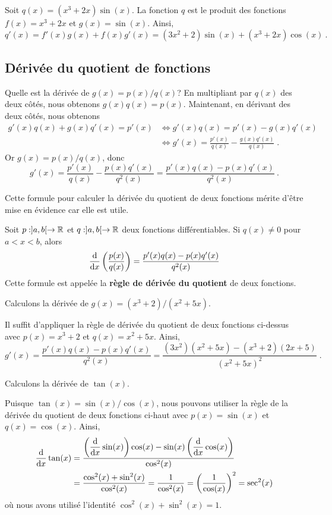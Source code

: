 {\begin{egg}
Soit $q(x) = (x^3+2x)\sin(x)$.  La fonction $q$ est le produit des
fonctions $f(x) = x^3+2x$ et $g(x) = \sin(x)$.  Ainsi,
\[
q'(x) = f'(x) g(x) + f(x) g'(x) = (3x^2 +2)\sin(x) + (x^3+2x)\cos(x) \ .
\]
\end{egg}

\subsection{Dérivée du quotient de fonctions}

Quelle est la dérivée de $g(x) = p(x) / q(x)$?  En multipliant par
$q(x)$ des deux côtés, nous obtenons $g(x) q(x) = p(x)$.  Maintenant, en
dérivant des deux côtés, nous obtenons
\begin{align*}
g'(x) q(x) + g(x) q'(x) = p'(x)
&\Leftrightarrow g'(x) q(x) = p'(x) - g(x) q'(x) \\
&\Leftrightarrow g'(x) = \frac{p'(x)}{q(x)} - \frac{g(x) q'(x)}{q(x)} \; .
\end{align*}
Or $g(x) = p(x) / q(x)$, donc
\[
g'(x) = \frac{p'(x)}{q(x)} - \frac{p(x) q'(x)}{q^2(x)}
= \frac{p'(x) q(x) - p(x) q'(x)}{q^2(x)} \ .
\]

Cette formule pour calculer la dérivée du quotient de deux fonctions
mérite d'être mise en évidence car elle est utile.

\begin{prop} 
Soit $p:]a,b[\to \RR$ et $q:]a,b[\to \RR$ deux fonctions
différentiables.  Si $q(x) \neq 0$ pour $a<x<b$, alors
\[
\dfdx{\left(\frac{p(x)}{q(x)}\right)}{x}
= \frac{p'(x) q(x) - p(x) q'(x)}{q^2(x)}
\]
Cette formule est appelée la {\bfseries règle de dérivée du
quotient} de deux fonctions.
\end{prop}

\begin{egg}
Calculons la dérivée de $g(x) = (x^3+2)/(x^2+5x)$.

Il suffit d'appliquer la règle de dérivée du quotient de deux
fonctions ci-dessus avec $p(x) = x^3+2$ et $q(x) = x^2+5x$.  Ainsi,
\[
g'(x) = \frac{p'(x) q(x) - p(x) q'(x)}{q^2(x)}
= \frac{(3x^2)(x^2+5x) - (x^3+2)(2x+5)}{(x^2+5x)^2} \; .
\]
\end{egg}

\begin{egg}
Calculons la dérivée de $\tan(x)$.

Puisque $\tan(x) = \sin(x) / \cos(x)$, nous pouvons utiliser la règle de la
dérivée du quotient de deux fonctions ci-haut avec
$p(x) = \sin(x)$ et $q(x) = \cos(x)$.  Ainsi,
\begin{align*}
\dfdx{\tan(x)}{x} &= \frac{\left(\DS \dfdx{\sin(x)}{x}\right) \cos(x)
- \sin(x) \left(\DS \dfdx{\cos(x)}{x}\right)}{\cos^2(x)} \\
&= \frac{ \cos^2(x) + \sin^2(x)}{\cos^2(x)}
= \frac{1}{\cos^2(x)}
= \left(\frac{1}{\cos(x)}\right)^2 = \sec^2(x)
\end{align*}
où nous avons utilisé l'identité $\cos^2(x) + \sin^2(x) = 1$.
\end{egg}

}
